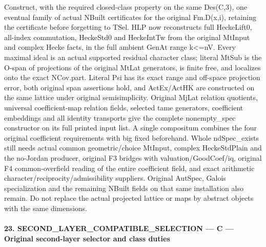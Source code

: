 \documentclass[11pt,a4paper]{article}
\numberwithin{equation}{section}
\theoremstyle{remark}\newtheorem{remark}[theorem]{Remark}
\begin{document}
Construct, with the required closed-class property on the same Des(C,3), one eventual family of actual NBuilt certificates for the original Fm.D(x,i), retaining the certificate before forgetting to TSel. HLP now reconstructs full HeckeLift0, all-index commutation, HeckeStd0 and HeckeIntTw from the original MtInput and complex Hecke facts, in the full ambient GenAt range k<=nV. Every maximal ideal is an actual supported residual character class; literal MtSub is the O-span of projections of the original MtLat generators, is finite free, and localizes onto the exact NCov.part. Literal Psi has its exact range and off-space projection error, both original span assertions hold, and ActEx/ActHK are constructed on the same lattice under original semisimplicity. Original MjLat relation quotients, universal coefficient-map relation fields, selected tame generators, coefficient embeddings and all identity transports give the complete nonempty\_\allowbreak spec constructor on its full printed input list. A single compositum combines the four original coefficient requirements with big fixed beforehand. Whole ndSpec\_\allowbreak exists still needs actual common geometric/choice MtInput, complex HeckeStdPlain and the no-Jordan producer, original F3 bridges with valuation/GoodCoef/iq, original F4 common-overfield reading of the entire coefficient field, and exact arithmetic character/reciprocity/admissibility suppliers. Original AutSpec, Galois specialization and the remaining NBuilt fields on that same installation also remain. Do not replace the actual projected lattice or maps by abstract objects with the same dimensions.



\paragraph{23. SECOND\_\allowbreak LAYER\_\allowbreak COMPATIBLE\_\allowbreak SELECTION — C — Original second-layer selector and class duties}
\end{document}
